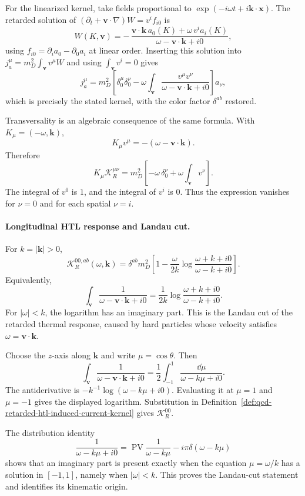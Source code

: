 For the linearized kernel, take fields proportional to
\(\exp(-i\omega t+i\mathbf k\cdot\mathbf x)\).  The retarded solution of
\((\partial_t+\mathbf v\cdot\nabla)W=v^if_{i0}\) is
\[
  W(K,\mathbf v)
  =
  -\,\frac{\mathbf v\cdot\mathbf k\,a_0(K)
  +\omega\,v^ia_i(K)}
  {\omega-\mathbf v\cdot\mathbf k+i0},
\]
using \(f_{i0}=\partial_ia_0-\partial_0a_i\) at linear order.  Inserting this
solution into \(j_a^\mu=m_D^2\int_{\mathbf v}v^\mu W\) and using
\(\int_{\mathbf v}v^i=0\) gives
\[
  j_a^\mu
  =
  m_D^2\left[
    \delta^\mu_0\delta^\nu_0
    -
    \omega\int_{\mathbf v}
    \frac{v^\mu v^\nu}
    {\omega-\mathbf v\cdot\mathbf k+i0}
  \right]a_\nu,
\]
which is precisely the stated kernel, with the color factor
\(\delta^{ab}\) restored.

Transversality is an algebraic consequence of the same formula.  With
\(K_\mu=(-\omega,\mathbf k)\),
\[
  K_\mu v^\mu=-(\omega-\mathbf v\cdot\mathbf k).
\]
Therefore
\[
  K_\mu\mathcal K_R^{\mu\nu}
  =
  m_D^2\left[
    -\omega\,\delta^\nu_0
    +
    \omega\int_{\mathbf v}v^\nu
  \right].
\]
The integral of \(v^0\) is \(1\), and the integral of \(v^i\) is \(0\).
Thus the expression vanishes for \(\nu=0\) and for each spatial \(\nu=i\).

\paragraph{Longitudinal HTL response and Landau cut.}
For \(k=|\mathbf k|>0\),
\[
  \mathcal K_R^{00,ab}(\omega,\mathbf k)
  =
  \delta^{ab}m_D^2
  \left[
    1-\frac{\omega}{2k}
    \log\frac{\omega+k+i0}{\omega-k+i0}
  \right].
\]
Equivalently,
\[
  \int_{\mathbf v}
  \frac{1}{\omega-\mathbf v\cdot\mathbf k+i0}
  =
  \frac{1}{2k}
  \log\frac{\omega+k+i0}{\omega-k+i0}.
\]
For \(|\omega|<k\), the logarithm has an imaginary part.  This is the
Landau cut of the retarded thermal response, caused by hard particles whose
velocity satisfies \(\omega=\mathbf v\cdot\mathbf k\).

Choose the \(z\)-axis along \(\mathbf k\) and write
\(\mu=\cos\theta\).  Then
\[
  \int_{\mathbf v}
  \frac{1}{\omega-\mathbf v\cdot\mathbf k+i0}
  =
  \frac12\int_{-1}^{1}
  \frac{\dd\mu}{\omega-k\mu+i0}.
\]
The antiderivative is \(-k^{-1}\log(\omega-k\mu+i0)\).  Evaluating it at
\(\mu=1\) and \(\mu=-1\) gives the displayed logarithm.  Substitution in
Definition~\ref{def:qcd-retarded-htl-induced-current-kernel} gives
\(\mathcal K_R^{00}\).

The distribution identity
\[
  \frac{1}{\omega-k\mu+i0}
  =
  \operatorname{PV}\frac{1}{\omega-k\mu}
  -i\pi\delta(\omega-k\mu)
\]
shows that an imaginary part is present exactly when the equation
\(\mu=\omega/k\) has a solution in \([-1,1]\), namely when
\(|\omega|<k\).  This proves the Landau-cut statement and identifies its
kinematic origin.


